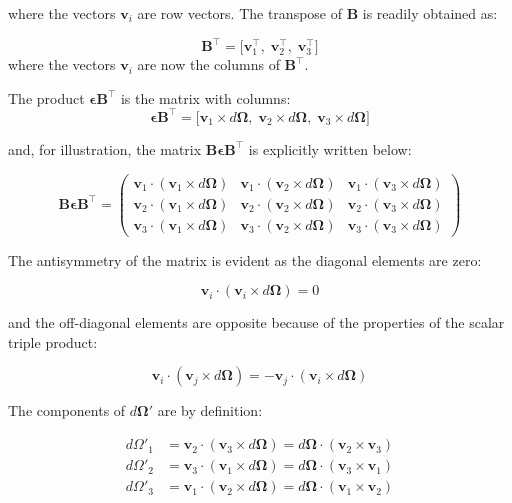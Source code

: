 \documentclass[12pt]{article}
\begin{document}
where the vectors $\mathbf{v}_i$ are row vectors. The transpose of $\mathbf{B}$ is readily
obtained as:

\[
  \mathbf{B}^\top = \bigl[\mathbf{v}_1^\top,\; \mathbf{v}_2^\top,\; \mathbf{v}_3^\top\bigr]
\]
where the vectors $\mathbf{v}_i$ are now the columns of $\mathbf{B}^\top$.

The product $\boldsymbol{\epsilon}\mathbf{B}^\top$ is the matrix with columns:
\[
  \boldsymbol{\epsilon}\mathbf{B}^\top =
  \bigl[\mathbf{v}_1 \times d\boldsymbol{\Omega},\;
        \mathbf{v}_2 \times d\boldsymbol{\Omega},\;
        \mathbf{v}_3 \times d\boldsymbol{\Omega}\bigr]
\]

and, for illustration, the matrix $\mathbf{B}\boldsymbol{\epsilon}\mathbf{B}^\top$ is
explicitly written below:

\[
  \mathbf{B}\boldsymbol{\epsilon}\mathbf{B}^\top =
  \begin{pmatrix}
    \mathbf{v}_1\cdot(\mathbf{v}_1\times d\boldsymbol{\Omega}) &
    \mathbf{v}_1\cdot(\mathbf{v}_2\times d\boldsymbol{\Omega}) &
    \mathbf{v}_1\cdot(\mathbf{v}_3\times d\boldsymbol{\Omega}) \\
    \mathbf{v}_2\cdot(\mathbf{v}_1\times d\boldsymbol{\Omega}) &
    \mathbf{v}_2\cdot(\mathbf{v}_2\times d\boldsymbol{\Omega}) &
    \mathbf{v}_2\cdot(\mathbf{v}_3\times d\boldsymbol{\Omega}) \\
    \mathbf{v}_3\cdot(\mathbf{v}_1\times d\boldsymbol{\Omega}) &
    \mathbf{v}_3\cdot(\mathbf{v}_2\times d\boldsymbol{\Omega}) &
    \mathbf{v}_3\cdot(\mathbf{v}_3\times d\boldsymbol{\Omega})
  \end{pmatrix}
\]

The antisymmetry of the matrix is evident as the diagonal elements are zero:

\[
  \mathbf{v}_i\cdot(\mathbf{v}_i\times d\boldsymbol{\Omega}) = 0
\]

and the off-diagonal elements are opposite because of the properties of the scalar triple
product:

\[
  \mathbf{v}_i\cdot(\mathbf{v}_j\times d\boldsymbol{\Omega}) =
  -\mathbf{v}_j\cdot(\mathbf{v}_i\times d\boldsymbol{\Omega})
\]

The components of $d\boldsymbol{\Omega}'$ are by definition:

\begin{align}
  d\Omega'_1 &= \mathbf{v}_2\cdot(\mathbf{v}_3\times d\boldsymbol{\Omega})
              = d\boldsymbol{\Omega}\cdot(\mathbf{v}_2\times\mathbf{v}_3) \\
  d\Omega'_2 &= \mathbf{v}_3\cdot(\mathbf{v}_1\times d\boldsymbol{\Omega})
              = d\boldsymbol{\Omega}\cdot(\mathbf{v}_3\times\mathbf{v}_1) \\
  d\Omega'_3 &= \mathbf{v}_1\cdot(\mathbf{v}_2\times d\boldsymbol{\Omega})
              = d\boldsymbol{\Omega}\cdot(\mathbf{v}_1\times\mathbf{v}_2)
\end{align}
\end{document}
